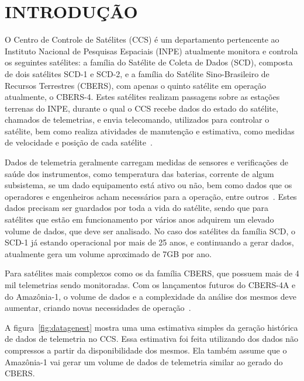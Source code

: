 
\chapter{INTRODUÇÃO}\label{ch:intro}

O Centro de Controle de Satélites (CCS) é um departamento pertencente ao Instituto Nacional de Pesquisas Espaciais (INPE) atualmente monitora e controla os seguintes satélites: a família do Satélite de Coleta de Dados (SCD), composta de dois satélites SCD-1 e SCD-2, e a família do Satélite Sino-Brasileiro de Recursos Terrestres (CBERS), com apenas o quinto satélite em operação atualmente, o CBERS-4.
Estes satélites realizam passagens sobre as estações terrenas do INPE, durante o qual o CCS recebe dados do estado do satélite, chamados de telemetrias, e envia telecomando, utilizados para controlar o satélite, bem como realiza atividades de manutenção e estimativa, como medidas de velocidade e posição de cada satélite~\cite{AzevedoAmbr:2010:ArSaTe}.

Dados de telemetria geralmente carregam medidas de sensores e verificações de saúde dos instrumentos, como temperatura das baterias, corrente de algum subsistema, se um dado equipamento está ativo ou não, bem como dados que os operadores e engenheiros acham necessários para a operação, entre outros~\cite{larsonSpaceMissionAnalysis1999}.
Estes dados precisam ser guardados por toda a vida do satélite, sendo que para satélites que estão em funcionamento por vários anos adquirem um elevado volume de dados, que deve ser analisado.
No caso dos satélites da família SCD, o SCD-1 já estando operacional por mais de 25 anos, e continuando a gerar dados, atualmente gera um volume aproximado de 7GB por ano.

Para satélites mais complexos como os da família CBERS, que possuem mais de 4 mil telemetrias sendo monitoradas.
Com os lançamentos futuros do CBERS-4A e do Amazônia-1, o volume de dados e a complexidade da análise dos mesmos deve aumentar, criando novas necessidades de operação~\cite{JulioFoAmbrFerrLour:2017:ChImSp}.

A figura~\ref{fig:datagenest} mostra uma uma estimativa simples da geração histórica de dados de telemetria no CCS.
Essa estimativa foi feita utilizando dos dados não compressos a partir da disponibilidade dos mesmos.
Ela também assume que o Amazônia-1 vai gerar um volume de dados de telemetria similar ao gerado do CBERS.

